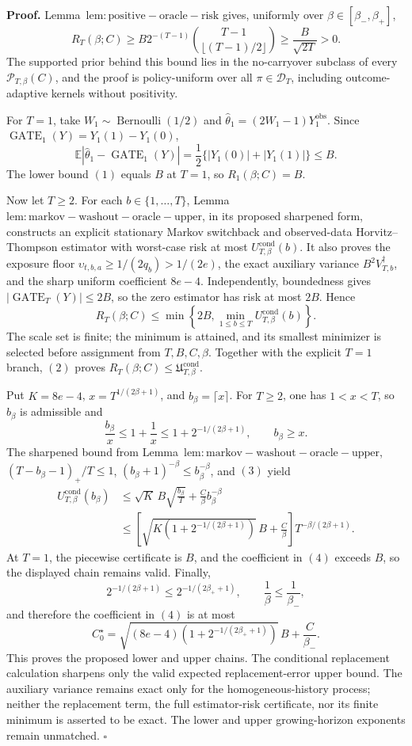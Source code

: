 \textbf{Proof.} Lemma~\(\mathrm{lem:positive-oracle-risk}\) gives, uniformly over \(\beta\in[\beta_-,\beta_+]\),
\[
R_T(\beta;C)\ge B2^{-(T-1)}\binom{T-1}{\lfloor(T-1)/2\rfloor}\ge\frac{B}{\sqrt{2T}}>0.
\tag{1}
\]
The supported prior behind this bound lies in the no-carryover subclass of every \(\mathcal P_{T,\beta}(C)\), and the proof is policy-uniform over all \(\pi\in\mathcal D_T\), including outcome-adaptive kernels without positivity.

For \(T=1\), take \(W_1\sim\operatorname{Bernoulli}(1/2)\) and \(\widehat\theta_1=(2W_1-1)Y_1^{\mathrm{obs}}\). Since \(\operatorname{GATE}_1(Y)=Y_1(1)-Y_1(0)\),
\[
\mathbb E|\widehat\theta_1-\operatorname{GATE}_1(Y)|
=\frac12\{|Y_1(0)|+|Y_1(1)|\}\le B.
\]
The lower bound \((1)\) equals \(B\) at \(T=1\), so \(R_1(\beta;C)=B\).

Now let \(T\ge2\). For each \(b\in\{1,\ldots,T\}\), Lemma~\(\mathrm{lem:markov-washout-oracle-upper}\), in its proposed sharpened form, constructs an explicit stationary Markov switchback and observed-data Horvitz--Thompson estimator with worst-case risk at most \(U_{T,\beta}^{\mathrm{cond}}(b)\). It also proves the exposure floor \(\upsilon_{t,b,a}\ge1/(2q_b)>1/(2e)\), the exact auxiliary variance \(B^2V_{T,b}^{\dagger}\), and the sharp uniform coefficient \(8e-4\). Independently, boundedness gives \(|\operatorname{GATE}_T(Y)|\le2B\), so the zero estimator has risk at most \(2B\). Hence
\[
R_T(\beta;C)\le\min\left\{2B,\min_{1\le b\le T}U_{T,\beta}^{\mathrm{cond}}(b)\right\}.
\tag{2}
\]
The scale set is finite; the minimum is attained, and its smallest minimizer is selected before assignment from \(T,B,C,\beta\). Together with the explicit \(T=1\) branch, \((2)\) proves \(R_T(\beta;C)\le\mathfrak U_{T,\beta}^{\mathrm{cond}}\).

Put \(K=8e-4\), \(x=T^{1/(2\beta+1)}\), and \(b_\beta=\lceil x\rceil\). For \(T\ge2\), one has \(1<x<T\), so \(b_\beta\) is admissible and
\[
\frac{b_\beta}{x}\le1+\frac1x\le1+2^{-1/(2\beta+1)},\qquad b_\beta\ge x.
\tag{3}
\]
The sharpened bound from Lemma~\(\mathrm{lem:markov-washout-oracle-upper}\), \((T-b_\beta-1)_+/T\le1\), \((b_\beta+1)^{-\beta}\le b_\beta^{-\beta}\), and \((3)\) yield
\[
\begin{aligned}
U_{T,\beta}^{\mathrm{cond}}(b_\beta)
&\le\sqrt K\,B\sqrt{\frac{b_\beta}{T}}+\frac C\beta b_\beta^{-\beta}\\
&\le\left[\sqrt{K\left(1+2^{-1/(2\beta+1)}\right)}\,B+\frac C\beta\right]T^{-\beta/(2\beta+1)}.
\end{aligned}
\tag{4}
\]
At \(T=1\), the piecewise certificate is \(B\), and the coefficient in \((4)\) exceeds \(B\), so the displayed chain remains valid. Finally,
\[
2^{-1/(2\beta+1)}\le2^{-1/(2\beta_++1)},\qquad \frac1\beta\le\frac1{\beta_-},
\]
and therefore the coefficient in \((4)\) is at most
\[
C_0^\star=\sqrt{(8e-4)\left(1+2^{-1/(2\beta_++1)}\right)}\,B+\frac C{\beta_-}.
\]
This proves the proposed lower and upper chains. The conditional replacement calculation sharpens only the valid expected replacement-error upper bound. The auxiliary variance remains exact only for the homogeneous-history process; neither the replacement term, the full estimator-risk certificate, nor its finite minimum is asserted to be exact. The lower and upper growing-horizon exponents remain unmatched. \(\square\)